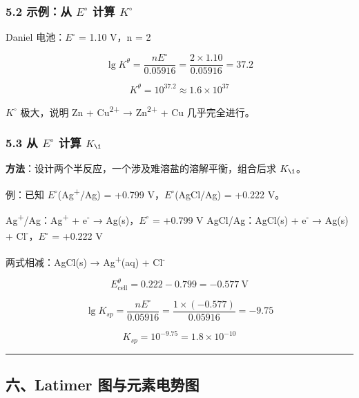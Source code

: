 \documentclass[a4paper,11pt]{ctexart}
\begin{document}
\subsubsection{\texorpdfstring{5.2 示例：从 \(E^{\circ}\) 计算 \(K^{\circ}\)}{5.2 示例：从 E\^{}\{\textbackslash circ\} 计算 K\^{}\{\textbackslash circ\}}}\label{ux793aux4f8bux4ece-ecirc-ux8ba1ux7b97-kcirc}

Daniel 电池：\(E^{\circ}\) = 1.10 V，n = 2

\[
\lg K^\theta = \frac{nE^\circ}{0.05916} = \frac{2 \times 1.10}{0.05916} = 37.2
\]

\[
K^\theta = 10^{37.2} \approx 1.6 \times 10^{37}
\]

\(K^{\circ}\) 极大，说明 Zn + Cu\textsuperscript{2+} → Zn\textsuperscript{2+} + Cu 几乎完全进行。

\subsubsection{\texorpdfstring{5.3 从 \(E^{\circ}\) 计算 \(K_{\1}\)}{5.3 从 E\^{}\{\textbackslash circ\} 计算 K\_\{\textbackslash1\}}}\label{ux4ece-ecirc-ux8ba1ux7b97-k_1}

\textbf{方法}：设计两个半反应，一个涉及难溶盐的溶解平衡，组合后求 \(K_{\1}\)。

例：已知 \(E^{\circ}\)(Ag\textsuperscript{+}/Ag) = +0.799 V，\(E^{\circ}\)(AgCl/Ag) = +0.222 V。

Ag\textsuperscript{+}/Ag：Ag\textsuperscript{+} + e\textsuperscript{-} → Ag(s)，\(E^{\circ}\) = +0.799 V
AgCl/Ag：AgCl(s) + e\textsuperscript{-} → Ag(s) + Cl\textsuperscript{-}，\(E^{\circ}\) = +0.222 V

两式相减：AgCl(s) → Ag\textsuperscript{+}(aq) + Cl\textsuperscript{-}

\[E_{\text{cell}}^\theta = 0.222 - 0.799 = -0.577\ \mathrm{V}\]

\[\lg K_{sp} = \frac{nE^\circ}{0.05916} = \frac{1 \times (-0.577)}{0.05916} = -9.75\]

\[K_{sp} = 10^{-9.75} = 1.8 \times 10^{-10}\]

\begin{center}\rule{0.5\linewidth}{0.5pt}\end{center}

\subsection{六、Latimer 图与元素电势图}\label{ux516dlatimer-ux56feux4e0eux5143ux7d20ux7535ux52bfux56fe}
\end{document}
